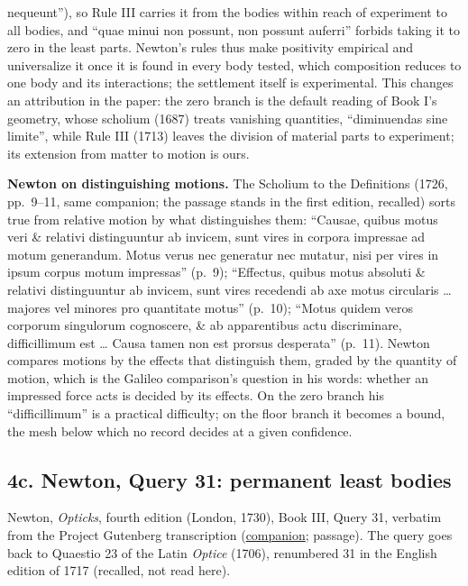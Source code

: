 \documentclass[11pt,a4paper]{article}
\begin{document}
\begin{itemize}
  nequeunt''), so Rule III carries it from the bodies within reach of
  experiment to all bodies, and ``quae minui non possunt, non possunt
  auferri'' forbids taking it to zero in the least parts. Newton's rules
  thus make positivity empirical and universalize it once it is found in
  every body tested, which composition reduces to one body and its
  interactions; the settlement itself is experimental. This changes an
  attribution in the paper: the zero branch is the default reading of
  Book I's geometry, whose scholium (1687) treats vanishing quantities,
  ``diminuendas sine limite'', while Rule III (1713) leaves the division
  of material parts to experiment; its extension from matter to motion
  is ours.
\end{itemize}

\textbf{Newton on distinguishing motions.} The Scholium to the
Definitions (1726, pp.~9--11, same companion; the passage stands in the
first edition, recalled) sorts true from relative motion by what
distinguishes them: ``Causae, quibus motus veri \& relativi
distinguuntur ab invicem, sunt vires in corpora impressae ad motum
generandum. Motus verus nec generatur nec mutatur, nisi per vires in
ipsum corpus motum impressas'' (p.~9); ``Effectus, quibus motus absoluti
\& relativi distinguuntur ab invicem, sunt vires recedendi ab axe motus
circularis \ldots{} majores vel minores pro quantitate motus'' (p.~10);
``Motus quidem veros corporum singulorum cognoscere, \& ab apparentibus
actu discriminare, difficillimum est \ldots{} Causa tamen non est
prorsus desperata'' (p.~11). Newton compares motions by the effects that
distinguish them, graded by the quantity of motion, which is the Galileo
comparison's question in his words: whether an impressed force acts is
decided by its effects. On the zero branch his ``difficillimum'' is a
practical difficulty; on the floor branch it becomes a bound, the mesh
below which no record decides at a given confidence.

\hypertarget{c.-newton-query-31-permanent-least-bodies}{%
\subsection{4c. Newton, Query 31: permanent least
bodies}\label{c.-newton-query-31-permanent-least-bodies}}

Newton, \emph{Opticks}, fourth edition (London, 1730), Book III, Query
31, verbatim from the Project Gutenberg transcription
(\href{../docs/classics/Newton_Opticks_1730_fits_and_queries.md}{companion};
passage). The query goes back to Quaestio 23 of the Latin \emph{Optice}
(1706), renumbered 31 in the English edition of 1717 (recalled, not read
here).
\end{document}
